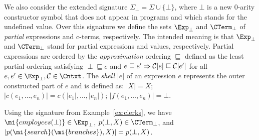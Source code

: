 We also consider the extended signature $\Sigma_\bot
=\Sigma\cup \{\bot\}$, where $\bot$ is a new $0$-arity constructor symbol that 
does not appear in programs and which stands for the undefined value. Over this signature 
we define the sets $\Exp_\bot$ and $\CTerm_\bot$ of {\it partial} expressions and c-terms, respectively.
The intended meaning is that $\Exp_\bot$ and $\CTerm_\bot$ stand for 
partial expressions and values, respectively.  
Partial expressions are ordered by the {\em approximation} ordering $\sqsubseteq$ defined as the least
partial ordering satisfying $\perp \sqsubseteq e$ and $e \sqsubseteq e'
\Rightarrow {\cal C}[e] \sqsubseteq {\cal C}[e']$
for all $e,e' \in \Exp_\perp, {\cal C} \in {\it \Cntxt}$.
The {\it shell} $|e|$ of an expression $e$ represents the outer constructed part
of $e$ and is defined as: $|X|=X$; $|c(e_1,\ldots,e_n)|=c(|e_1|,\ldots,|e_n|)$; $|f(e_1,\ldots,e_n)|=\bot$.  

\begin{example}
Using the signature from Example~\ref{ex:clerks}, we have
$\mi{employees(\bot)} \in \Exp_\bot$,
$p(\bot, X) \in \CTerm_\bot$, and
$|p(\mi{search}(\mi{branches}), X)| = p(\bot, X)$.
\end{example}

